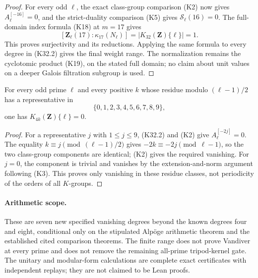 \begin{proof}
For every odd $\ell$, the exact class-group comparison (K2) now
gives $A_\ell^{[-16]}=0$, and the strict-duality comparison (K5)
gives $\mathcal S_\ell(16)=0$. The full-domain index formula (K18)
at $m=17$ gives
\[
 [\mathbf Z_\ell(17):\kappa_{17}(N_\ell)]
       =|K_{32}(\mathbf Z)\{\ell\}|=1.
\]
This proves surjectivity and its reductions. Applying the same
formula to every degree in (K32.2) gives the final weight range.
The normalization remains the cyclotomic product (K19), on the
stated full domain; no claim about unit values on a deeper
Galois filtration subgroup is used.
\end{proof}

\begin{corollary}
\label{cor:nine-degrees-period}
For every odd prime $\ell$ and every positive $k$ whose residue
modulo $(\ell-1)/2$ has a representative in
\[
                            \{0,1,2,3,4,5,6,7,8,9\},
\]
one has $K_{4k}(\mathbf Z)\{\ell\}=0$.
\end{corollary}

\begin{proof}
For a representative $j$ with $1\leq j\leq9$, (K32.2) and (K2)
give $A_\ell^{[-2j]}=0$. The equality
$k\equiv j\pmod{(\ell-1)/2}$ gives
$-2k\equiv-2j\pmod{\ell-1}$, so the two class-group components
are identical; (K2) gives the required vanishing. For $j=0$, the
component is trivial and vanishes by the extension-and-norm
argument following (K3). This proves only vanishing in these
residue classes, not periodicity of the orders of all $K$-groups.
\end{proof}

\paragraph{Arithmetic scope.}
These are seven new specified vanishing degrees beyond the known
degrees four and eight, conditional only on the stipulated Alp\"oge
arithmetic theorem and the established cited comparison theorems.
The finite range does not prove Vandiver at every prime and does
not remove the remaining all-prime tripod-kernel gate. The unitary
and modular-form calculations are complete exact certificates
with independent replays; they are not claimed to be Lean proofs.
